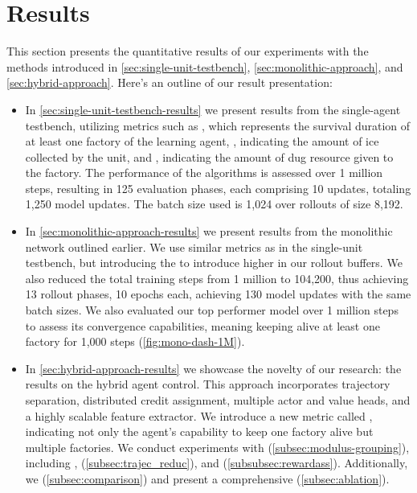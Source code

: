 \chapter{Results}
\label{ch:resu}

\noindent This section presents the quantitative results of our experiments with the methods introduced in \autoref{sec:single-unit-testbench}, \autoref{sec:monolithic-approach}, and \autoref{sec:hybrid-approach}. Here's an outline of our result presentation:

\begin{itemize}

\item In \autoref{sec:single-unit-testbench-results} we present results from the single-agent testbench, utilizing metrics such as , which represents the survival duration of at least one factory of the learning agent, , indicating the amount of ice collected by the unit, and , indicating the amount of dug resource given to the factory. The performance of the algorithms is assessed over 1 million steps, resulting in 125 evaluation phases, each comprising 10 updates, totaling 1,250 model updates. The batch size used is 1,024 over rollouts of size 8,192.

\item In \autoref{sec:monolithic-approach-results} we present results from the monolithic network outlined earlier. We use similar metrics as in the single-unit testbench, but introducing the  to introduce higher  in our rollout buffers. We also reduced the total training steps from 1 million to 104,200, thus achieving 13 rollout phases, 10 epochs each, achieving 130 model updates with the same batch sizes. We also evaluated our top performer model over 1 million steps to assess its convergence capabilities, meaning keeping alive at least one factory for 1,000 steps (\autoref{fig:mono-dash-1M}).

\item In \autoref{sec:hybrid-approach-results} we showcase the novelty of our research: the results on the hybrid agent control. This approach incorporates trajectory separation, distributed credit assignment, multiple actor and value heads, and a highly scalable feature extractor. We introduce a new metric called , indicating not only the agent's capability to keep one factory alive but multiple factories. We conduct experiments with  (\autoref{subsec:modulus-grouping}), including ,  (\autoref{subsec:trajec_reduc}), and  (\autoref{subsubsec:rewardass}). Additionally, we  (\autoref{subsec:comparison}) and present a comprehensive  (\autoref{subsec:ablation}).

\end{itemize}

